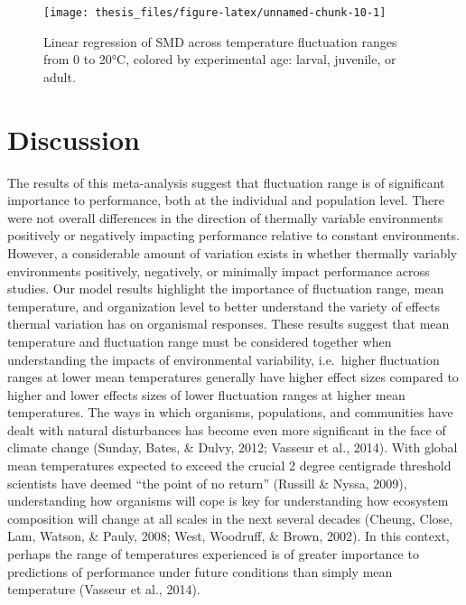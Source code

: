 \documentclass[12pt,twoside]{reedthesis}
\begin{document}
\begin{figure}

{\centering \texttt{[image: thesis\_files/figure-latex/unnamed-chunk-10-1]} 

}

\caption[Effect sizes across temperature range by experimental age]{Linear regression of SMD across temperature fluctuation ranges from 0 to 20°C, colored by experimental age: larval, juvenile, or adult.}\label{fig:unnamed-chunk-10}
\end{figure}
\hypertarget{discussion}{%
\chapter{Discussion}\label{discussion}}

The results of this meta-analysis suggest that fluctuation range is of significant importance to performance, both at the individual and population level. There were not overall differences in the direction of thermally variable environments positively or negatively impacting performance relative to constant environments. However, a considerable amount of variation exists in whether thermally variably environments positively, negatively, or minimally impact performance across studies. Our model results highlight the importance of fluctuation range, mean temperature, and organization level to better understand the variety of effects thermal variation has on organismal responses. These results suggest that mean temperature and fluctuation range must be considered together when understanding the impacts of environmental variability, i.e.~higher fluctuation ranges at lower mean temperatures generally have higher effect sizes compared to higher and lower effects sizes of lower fluctuation ranges at higher mean temperatures. The ways in which organisms, populations, and communities have dealt with natural disturbances has become even more significant in the face of climate change (Sunday, Bates, \& Dulvy, 2012; Vasseur et al., 2014). With global mean temperatures expected to exceed the crucial 2 degree centigrade threshold scientists have deemed ``the point of no return'' (Russill \& Nyssa, 2009), understanding how organisms will cope is key for understanding how ecosystem composition will change at all scales in the next several decades (Cheung, Close, Lam, Watson, \& Pauly, 2008; West, Woodruff, \& Brown, 2002). In this context, perhaps the range of temperatures experienced is of greater importance to predictions of performance under future conditions than simply mean temperature (Vasseur et al., 2014).
\end{document}
